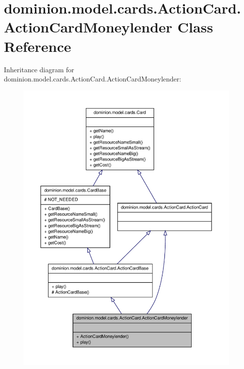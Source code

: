 \hypertarget{classdominion_1_1model_1_1cards_1_1ActionCard_1_1ActionCardMoneylender}{\section{dominion.\-model.\-cards.\-Action\-Card.\-Action\-Card\-Moneylender \-Class \-Reference}
\label{classdominion_1_1model_1_1cards_1_1ActionCard_1_1ActionCardMoneylender}
}


\-Inheritance diagram for dominion.\-model.\-cards.\-Action\-Card.\-Action\-Card\-Moneylender\-:
\nopagebreak
\begin{figure}[H]
\begin{center}
\leavevmode
\includegraphics[width=350pt]{classdominion_1_1model_1_1cards_1_1ActionCard_1_1ActionCardMoneylender__inherit__graph}
\end{center}
\end{figure}


